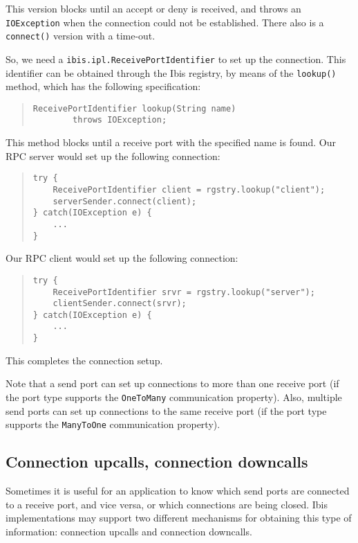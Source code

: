 \documentclass[10pt]{article}
\newcommand{\mysubsection}[1]{\subsection{#1}\label{#1}}
\begin{document}
\noindent
This version blocks until an accept or deny is received, and throws
an \texttt{IOException} when the connection could not be established.
There also is a \texttt{connect()} version with a time-out.

So, we need a \texttt{ibis.ipl.ReceivePortIdentifier} to set up the
connection.
This identifier can be obtained through the Ibis registry, by
means of the \texttt{lookup()} method, which has the following specification:

\begin{quote}
\begin{verbatim}
ReceivePortIdentifier lookup(String name)
        throws IOException;
\end{verbatim}
\end{quote}
\noindent
This method blocks until a receive port with the specified name is found.
Our RPC server would set up the following connection:

\begin{quote}
\begin{verbatim}
try {
    ReceivePortIdentifier client = rgstry.lookup("client");
    serverSender.connect(client);
} catch(IOException e) {
    ...
}
\end{verbatim}
\end{quote}

\noindent
Our RPC client would set up the following connection:

\begin{quote}
\begin{verbatim}
try {
    ReceivePortIdentifier srvr = rgstry.lookup("server");
    clientSender.connect(srvr);
} catch(IOException e) {
    ...
}
\end{verbatim}
\end{quote}

This completes the connection setup.

Note that a send port can set up connections to more than one
receive port (if the port type supports the \texttt{OneToMany}
communication property). Also, multiple send ports can set up
connections to the same receive port (if the port type supports
the \texttt{ManyToOne} communication property).

\mysubsection{Connection upcalls, connection downcalls}

Sometimes it is useful for an application to know which send ports
are connected to a receive port, and vice versa, or which connections
are being closed.
Ibis implementations may support two different mechanisms for obtaining
this type of information: connection upcalls and connection downcalls.
\end{document}
